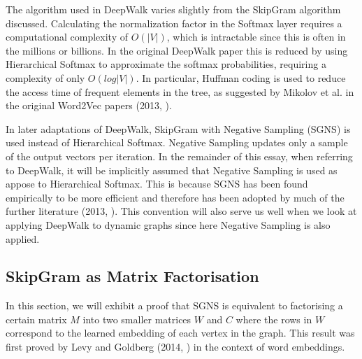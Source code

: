 \documentclass[a4paper]{article}
\begin{document}
The algorithm used in DeepWalk varies slightly from the SkipGram algorithm
discussed. Calculating the normalization factor in the Softmax layer requires a
computational complexity of $O(|V|)$, which is intractable since this is often
in the millions or billions. In the original DeepWalk paper this is
reduced by using Hierarchical Softmax to approximate the softmax probabilities,
requiring a complexity of only $O(log|V|)$. In particular, Huffman coding is
used to reduce the access time of frequent elements in the tree, as suggested by
Mikolov et al. in the original Word2Vec
papers (2013, \cite{mikolov2013efficient,mikolov2013distributed}).

In later adaptations of DeepWalk, SkipGram with Negative Sampling (SGNS) is used instead of
Hierarchical Softmax. Negative Sampling updates only a sample of the output
vectors per iteration. In the remainder of this essay, when referring to DeepWalk, it will be
implicitly assumed that Negative Sampling is used as appose to Hierarchical
Softmax. This is because SGNS has been found empirically to be more efficient
and therefore has been adopted by much of the further literature (2013, \cite{mikolov2013distributed}). This convention will also
serve us well when we look at applying DeepWalk to dynamic graphs since here
Negative Sampling is also applied.\\
\subsection{SkipGram as Matrix Factorisation}
In this section, we will exhibit a proof that SGNS is
equivalent to factorising a certain matrix $M$ into two smaller matrices $W$
and $C$ where the rows in $W$ correspond to the learned embedding of each vertex
in the graph. This result was first proved by Levy and
Goldberg (2014, \cite{levy&goldberg}) in the context of word embeddings.\\
\end{document}
